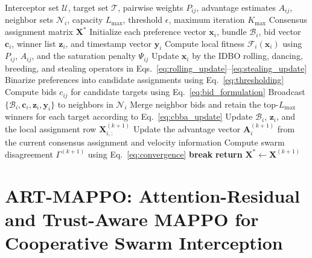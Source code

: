 \documentclass[lettersize,journal]{IEEEtran}
\begin{document}
\begin{algorithm}[!t]
\caption{Distributed Consensus-Based IDBO Target Assignment}
\label{alg:idbo}
\footnotesize
\begin{algorithmic}[1]
\REQUIRE Interceptor set $\mathcal{U}$, target set $\mathcal{T}$, pairwise weights $P_{ij}$,
advantage estimates $A_{ij}$, neighbor sets $\mathcal{N}_i$, capacity $L_{\max}$, threshold
$\epsilon$, maximum iteration $K_{\max}$
\ENSURE Consensus assignment matrix $\mathbf{X}^{*}$
\STATE Initialize each preference vector $\mathbf{x}_i$, bundle $\mathcal{B}_i$, bid vector
$\mathbf{c}_i$, winner list $\mathbf{z}_i$, and timestamp vector $\mathbf{y}_i$
        \STATE Compute local fitness $\mathcal{F}_i(\mathbf{x}_i)$ using $P_{ij}$,
        $A_{ij}$, and the saturation penalty $\Psi_{ij}$
        \STATE Update $\mathbf{x}_i$ by the IDBO rolling, dancing, breeding, and stealing
        operators in Eqs.~\eqref{eq:rolling_update}--\eqref{eq:stealing_update}
        \STATE Binarize preferences into candidate assignments using
        Eq.~\eqref{eq:thresholding}
        \STATE Compute bids $c_{ij}$ for candidate targets using Eq.~\eqref{eq:bid_formulation}
        \STATE Broadcast $\{\mathcal{B}_i,\mathbf{c}_i,\mathbf{z}_i,\mathbf{y}_i\}$ to
        neighbors in $\mathcal{N}_i$
        \STATE Merge neighbor bids and retain the top-$L_{\max}$ winners for each target
        according to Eq.~\eqref{eq:cbba_update}
        \STATE Update $\mathcal{B}_i$, $\mathbf{z}_i$, and the local assignment row
        $\mathbf{X}_{i,:}^{(k+1)}$
        \STATE Update the advantage vector $\mathbf{A}_i^{(k+1)}$ from the current consensus
        assignment and velocity information
    \ENDFOR
    \STATE Compute swarm disagreement $\Gamma^{(k+1)}$ using Eq.~\eqref{eq:convergence}
        \STATE \textbf{break}
    \ENDIF
\ENDFOR
\STATE \textbf{return} $\mathbf{X}^{*}\leftarrow\mathbf{X}^{(k+1)}$
\end{algorithmic}
\end{algorithm}













\section{ART-MAPPO: Attention-Residual and Trust-Aware MAPPO for Cooperative Swarm Interception}
\label{sec:cooperative_algorithm}
\end{document}
